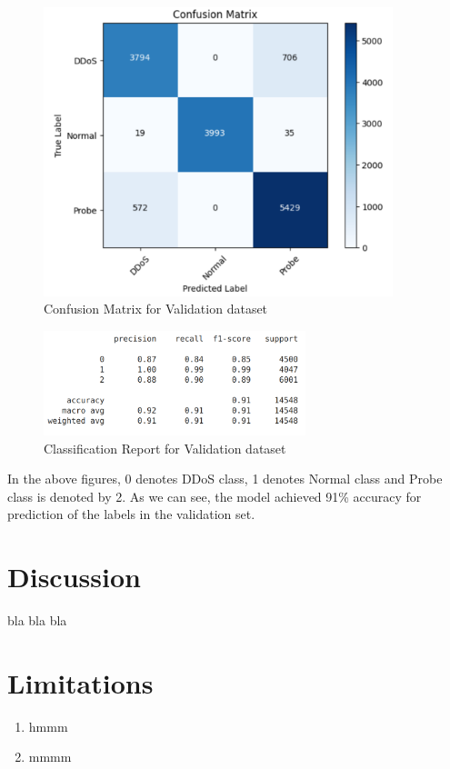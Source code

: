 \begin{figure}[tbh] %
	\begin{center}
		\includegraphics[width=4in]{images/confMatVal.png} 
		\caption{Confusion Matrix for Validation dataset} %
		\label{Confusion Matrix for Validation dataset} 
	\end{center}
\end{figure}
\begin{figure}[tbh] %
	\begin{center}
		\includegraphics[width=3in]{images/cReportVal.png} 
		\caption{Classification Report for Validation dataset} %
		\label{Classification Report for Validation dataset} 
	\end{center}
\end{figure}
\newpage
In the above figures, 0 denotes DDoS class, 1 denotes Normal class and Probe class is denoted by 2. As we can see, the model achieved 91\% accuracy for prediction of the labels in the validation set.
\section{Discussion}
\vspace{-18pt}
bla bla bla
\section{Limitations}
\begin{enumerate}
	\item hmmm
	\item mmmm
\end{enumerate}
